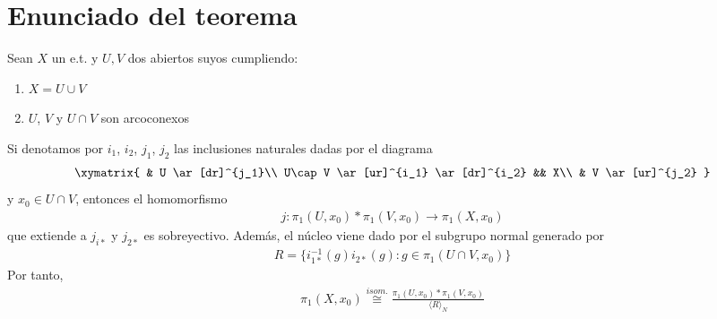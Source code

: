 \section{Enunciado del teorema}

\begin{teo}
    Sean $X$ un e.t. y $U,V$ dos abiertos suyos cumpliendo:
    \begin{enumerate}
        \item $X=U\cup V$
        \item $U$, $V$ y $U\cap V$ son arcoconexos
    \end{enumerate}
    Si denotamos por $i_1$, $i_2$, $j_1$, $j_2$ las inclusiones naturales dadas por el diagrama
    \begin{gather*}
        \xymatrix{
            & U \ar[dr]^{j_1}\\
            U\cap V \ar[ur]^{i_1} \ar[dr]^{i_2} && X\\
            & V \ar[ur]^{j_2}
        }
    \end{gather*}
    y $x_0\in U\cap V$, entonces el homomorfismo
    \begin{gather*}
        j:\pi_1(U,x_0) \ast \pi_1(V,x_0) \to \pi_1(X,x_0)
    \end{gather*}
    que extiende a $j_{i*}$ y $j_{2*}$ es sobreyectivo. Además, el núcleo viene dado por el subgrupo normal generado por 
    \begin{gather*}
        R = \{i_{1*}^{-1}(g)i_{2*}(g) : g\in \pi_1(U\cap V,x_0)\}
    \end{gather*}
    Por tanto, 
    \begin{gather*}
        \pi_1(X,x_0) \overset{isom.}{\cong} \frac{\pi_1(U,x_0)\ast \pi_1(V,x_0)}{\langle R \rangle_N}
    \end{gather*}
\end{teo}

